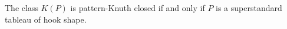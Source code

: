 \begin{theo}
\label{pkc:main}
The class $K(P)$ is pattern-Knuth closed if and only if $P$ is a superstandard tableau of hook shape.
\end{theo}
